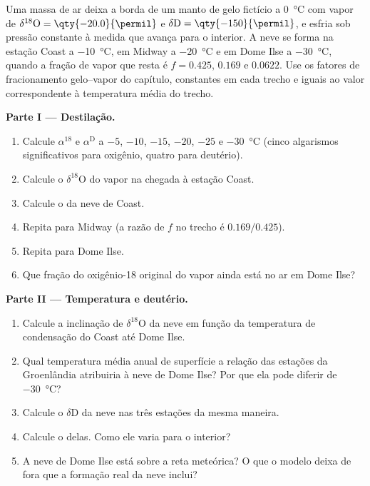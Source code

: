 \begin{problem}\label{pb:b3:stable-isotopes:1}
Uma massa de ar deixa a borda de um manto de gelo fictício a \qty{0}{\celsius}
com vapor de $\delta^{18}\mathrm O = \qty{-20.0}{\permil}$ e $\delta\mathrm D =
\qty{-150}{\permil}$, e esfria sob pressão constante à medida que avança para o interior.
A neve se forma na estação Coast a \qty{-10}{\celsius}, em Midway a
\qty{-20}{\celsius} e em Dome Ilse a \qty{-30}{\celsius}, quando a fração
de vapor que resta é $f = 0.425$, $0.169$ e $0.0622$. Use os fatores de fracionamento gelo--vapor
do capítulo, constantes em cada trecho e iguais ao valor
correspondente à temperatura média do trecho.

\medskip\noindent\textbf{Parte I --- Destilação.}
\begin{enumerate}
\item Calcule $\alpha^{18}$ e $\alpha^{\mathrm D}$ a $-5$, $-10$, $-15$, $-20$,
$-25$ e \qty{-30}{\celsius} (cinco algarismos significativos para oxigênio, quatro para
deutério).
\item Calcule o $\delta^{18}\mathrm O$ do vapor na chegada à estação Coast.
\item Calcule o da neve de Coast.
\item Repita para Midway (a razão de $f$ no trecho é $0.169/0.425$).
\item Repita para Dome Ilse.
\item Que fração do oxigênio-18 original do vapor ainda está no ar
em Dome Ilse?
\end{enumerate}

\medskip\noindent\textbf{Parte II --- Temperatura e deutério.}
\begin{enumerate}[resume]
\item Calcule a inclinação de $\delta^{18}\mathrm O$ da neve em função da
temperatura de condensação do Coast até Dome Ilse.
\item Qual temperatura média anual de superfície a relação das estações da
Groenlândia atribuiria à neve de Dome Ilse? Por que ela pode diferir de
\qty{-30}{\celsius}?
\item Calcule o $\delta\mathrm D$ da neve nas três estações da mesma maneira.
\item Calcule o  delas. Como ele varia para o interior?
\item A neve de Dome Ilse está sobre a reta meteórica? O que o modelo
deixa de fora que a formação real da neve inclui?
\end{enumerate}


\end{problem}

